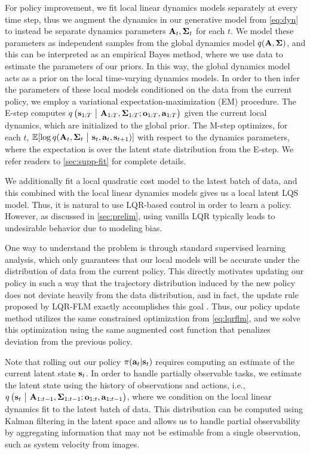 For policy improvement, we fit local linear dynamics models separately at every time step, thus we augment the dynamics in our generative model from \autoref{eq:dyn} to instead be separate dynamics parameters $\mathbf{A}_t,\bm{\Sigma}_t$ for each $t$. We model these parameters as independent samples from the global dynamics model $q(\mathbf{A},\bm{\Sigma})$, and this can be interpreted as an empirical Bayes method, where we use data to estimate the parameters of our priors. In this way, the global dynamics model acts as a prior on the local time-varying dynamics models. In order to then infer the parameters of these local models conditioned on the data from the current policy, we employ a variational expectation-maximization (EM) procedure. The E-step computes $q\left(\mathbf{s}_{1:T}~\big|~\mathbf{A}_{1:T},\bm{\Sigma}_{1:T};\mathbf{o}_{1:T},\mathbf{a}_{1:T}\right)$ given the current local dynamics, which are initialized to the global prior. The M-step optimizes, for each $t$, $\mathbb{E}[\log{q}(\mathbf{A}_t,\bm{\Sigma}_t~\big|~\mathbf{s}_t,\mathbf{a}_t,\mathbf{s}_{t+1})]$ with respect to the dynamics parameters, where the expectation is over the latent state distribution from the E-step. We refer readers to \autoref{sec:supp-fit} for complete details.

We additionally fit a local quadratic cost model to the latest batch of data, and this combined with the local linear dynamics models gives us a local latent LQS model. Thus, it is natural to use LQR-based control in order to learn a policy. However, as discussed in \autoref{sec:prelim}, using vanilla LQR typically leads to undesirable behavior due to modeling bias.

One way to understand the problem is through standard supervised learning analysis, which only guarantees that our local models will be accurate under the distribution of data from the current policy. This directly motivates updating our policy in such a way that the trajectory distribution induced by the new policy does not deviate heavily from the data distribution, and in fact, the update rule proposed by LQR-FLM exactly accomplishes this goal \citep{mfcgps}. Thus, our policy update method utilizes the same constrained optimization from \autoref{eq:lqrflm}, and we solve this optimization using the same augmented cost function that penalizes deviation from the previous policy.

Note that rolling out our policy $\pi(\mathbf{a}_t|\mathbf{s}_t)$ requires computing an estimate of the current latent state $\mathbf{s}_t$. In order to handle partially observable tasks, we estimate the latent state using the history of observations and actions, i.e., $q\left(\mathbf{s}_t~\big|~\mathbf{A}_{1:t-1},\bm{\Sigma}_{1:t-1};\mathbf{o}_{1:t},\mathbf{a}_{1:t-1}\right)$, where we condition on the local linear dynamics fit to the latest batch of data. This distribution can be computed using Kalman filtering in the latent space and allows us to handle partial observability by aggregating information that may not be estimable from a single observation, such as system velocity from images.


